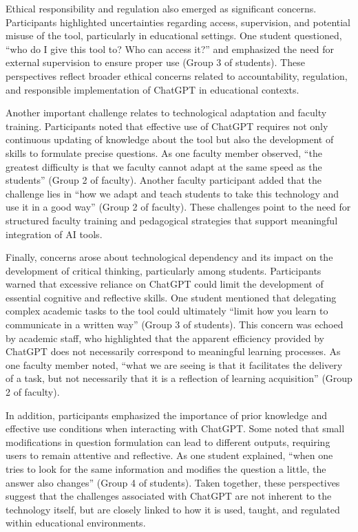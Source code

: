 \documentclass[english]{textolivre}
\begin{document}
Ethical responsibility and regulation also emerged as significant concerns. Participants highlighted uncertainties regarding access, supervision, and potential misuse of the tool, particularly in educational settings. One student questioned, “who do I give this tool to? Who can access it?” and emphasized the need for external supervision to ensure proper use (Group 3 of students). These perspectives reflect broader ethical concerns related to accountability, regulation, and responsible implementation of ChatGPT in educational contexts.

Another important challenge relates to technological adaptation and faculty training. Participants noted that effective use of ChatGPT requires not only continuous updating of knowledge about the tool but also the development of skills to formulate precise questions. As one faculty member observed, “the greatest difficulty is that we faculty cannot adapt at the same speed as the students” (Group 2 of faculty). Another faculty participant added that the challenge lies in “how we adapt and teach students to take this technology and use it in a good way” (Group 2 of faculty). These challenges point to the need for structured faculty training and pedagogical strategies that support meaningful integration of AI tools.

Finally, concerns arose about technological dependency and its impact on the development of critical thinking, particularly among students. Participants warned that excessive reliance on ChatGPT could limit the development of essential cognitive and reflective skills. One student mentioned that delegating complex academic tasks to the tool could ultimately “limit how you learn to communicate in a written way” (Group 3 of students). This concern was echoed by academic staff, who highlighted that the apparent efficiency provided by ChatGPT does not necessarily correspond to meaningful learning processes. As one faculty member noted, “what we are seeing is that it facilitates the delivery of a task, but not necessarily that it is a reflection of learning acquisition” (Group 2 of faculty).

In addition, participants emphasized the importance of prior knowledge and effective use conditions when interacting with ChatGPT. Some noted that small modifications in question formulation can lead to different outputs, requiring users to remain attentive and reflective. As one student explained, “when one tries to look for the same information and modifies the question a little, the answer also changes” (Group 4 of students). Taken together, these perspectives suggest that the challenges associated with ChatGPT are not inherent to the technology itself, but are closely linked to how it is used, taught, and regulated within educational environments.
\end{document}
